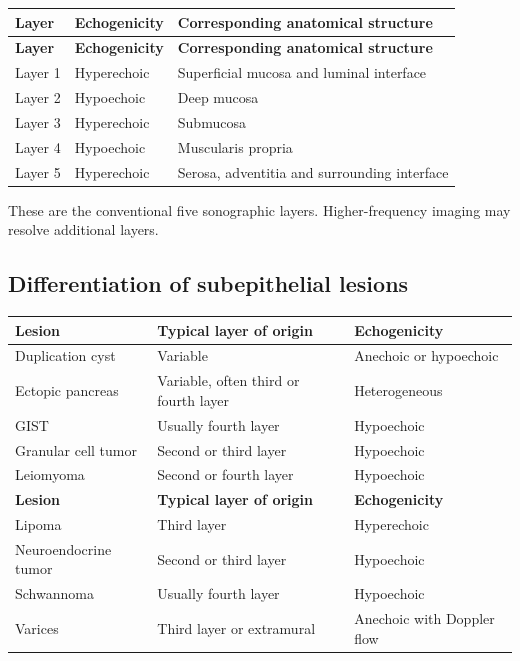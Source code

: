 \begin{longtable}{@{}p{}p{}p{}@{}}
\toprule
\textbf{Layer} & \textbf{Echogenicity} & \textbf{Corresponding anatomical structure} \\
\midrule
\endfirsthead
\toprule
\textbf{Layer} & \textbf{Echogenicity} & \textbf{Corresponding anatomical structure} \\
\midrule
\endhead
Layer 1 & Hyperechoic & Superficial mucosa and luminal interface \\
Layer 2 & Hypoechoic & Deep mucosa \\
Layer 3 & Hyperechoic & Submucosa \\
Layer 4 & Hypoechoic & Muscularis propria \\
Layer 5 & Hyperechoic & Serosa, adventitia and surrounding interface \\
\bottomrule
\end{longtable}
These are the conventional five sonographic layers. Higher-frequency imaging may resolve additional layers.

\subsection{Differentiation of subepithelial lesions}
\begin{longtable}{@{}p{}p{}p{}@{}}
\toprule
\textbf{Lesion} & \textbf{Typical layer of origin} & \textbf{Echogenicity} \\
\midrule
\endfirsthead
\toprule
Duplication cyst & Variable & Anechoic or hypoechoic \\
\midrule
\endhead
Ectopic pancreas & Variable, often third or fourth layer & Heterogeneous \\
GIST & Usually fourth layer & Hypoechoic \\
Granular cell tumor & Second or third layer & Hypoechoic \\
Leiomyoma & Second or fourth layer & Hypoechoic \\
\textbf{Lesion} & \textbf{Typical layer of origin} & \textbf{Echogenicity} \\
Lipoma & Third layer & Hyperechoic \\
Neuroendocrine tumor & Second or third layer & Hypoechoic \\
Schwannoma & Usually fourth layer & Hypoechoic \\
Varices & Third layer or extramural & Anechoic with Doppler flow \\
\bottomrule
\end{longtable}

